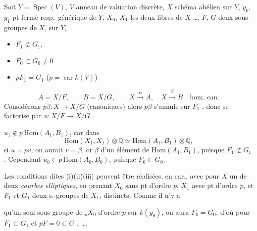 \documentclass[11pt,a4paper]{article}
\begin{document}
Soit $Y = \operatorname{Spec}(V)$, $V$ anneau de valuation discrète, $X$ schéma abélien sur $Y$, $y_0$, $y_1$ pt fermé resp.\ générique de $Y$, $X_0$, $X_1$ les deux fibres de $X$ …, $F$, $G$ deux sous-groupes de $X$,  sur $Y$,
\begin{itemize}
\item[(i)] $F_1 \not\subset G_1$, \struck{\ill{}}
\item[(ii)] $F_0 \subset G_0 \neq 0$
\item[(iii)] $pF_1 = G_1$ \quad ($p = \operatorname{car} k(V)$)
\end{itemize}
\[
A = X/F , \qquad B = X/G , \qquad X \xrightarrow{\ \alpha\ } A , \quad X \xrightarrow{\ \beta\ } B \quad \text{hom.\ can.}
\]
Considérons $p\beta : X \to X/G$ (canoniques) alors $p\beta$ s'annule  sur $F_1$ , donc se factorise par $u : X/F \to X/G$


 $u_1 \notin p\,\mathrm{Hom}(A_1, B_1)$, car \struck{\ill{}}   dans
\[
\mathrm{Hom}(X_1, X_1) \otimes \mathbb{Q} \simeq \mathrm{Hom}(A_1, B_1) \otimes \mathbb{Q} ,
\]
si   $u = pv$, on aurait $v = \beta$, or $\beta$   \ill{} d'un élément de $\mathrm{Hom}(A_1, B_1)$, puisque $F_1 \not\subset G_1$ \struck{[\ill{}, \ill{} (i)], \ill{} $F_1 = 0$ \ill{} \ill{}, \ill{} que contredit (ii)]}. Cependant $u_0 \in p\,\mathrm{Hom}(A_0, B_0)$, puisque $F_0 \subset G_0$.

Les conditions dites (i)(ii)(iii) peuvent être réalisées, en  car., avec pour $X$ un  de deux \emph{courbes elliptiques}, en prenant $X_0$ sans pt d'ordre $p$, $X_1$ avec pt d'ordre $p$, et $F_1$ et $G_1$ deux s.-groupes de $X_1$, \struck{\ill{} \ill{}}  distincts. Comme il n'y a

qu'un seul sous-groupe  de ${}_pX_0$ d'ordre $p$ sur $k(y_0)$, on aura $F_0 = G_0$, d'où \ill{} pour $F_1 \subset G_1$ et $pF = 0 \subset G$ \ill{} \ill{},  …,
\end{document}
